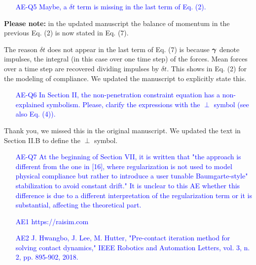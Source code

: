 \textcolor{blue}{\begin{itemize}
\item[AE-Q5] Maybe, a $\delta t$ term is missing in the last term of Eq. (2).
\end{itemize}} 

\textbf{Please note:} in the updated manuscript the balance of momentum in the
previous Eq. (2) is now stated in Eq. (7).

The reason $\delta t$ does not appear in the last term of Eq. (7) is because
${\bm\gamma}$ denote impulses, the integral (in this case over one time step) of the
forces. Mean forces over a time step are recovered dividing impulses by $\delta
t$. This shows in Eq. (2) for the modeling of compliance. We updated the
manuscript to explicitly state this.

\textcolor{blue}{\begin{itemize}
\item[AE-Q6] In Section II, the non-penetration constraint equation has a non-explained
symbolism. Please, clarify the expressions with the $\perp$ symbol (see also Eq.
(4)).\end{itemize}}

Thank you, we missed this in the original manuscript. We updated the text in
Section II.B to define the $\perp$ symbol.
    
\textcolor{blue}{\begin{itemize}
\item[AE-Q7] At the beginning of Section VII, it is written that "the approach is
different from the one in [16], where regularization is not used to model
physical compliance but rather to introduce a user tunable Baumgarte-style"
stabilization to avoid constant drift." It is unclear to this AE whether this
difference is due to a different interpretation of the regularization term or it
is substantial, affecting the theoretical part.\end{itemize}} 

\vspace{5mm}
\textcolor{blue}{\begin{itemize}
    \item[AE1] https://raisim.com
    \item[AE2] J. Hwangbo, J. Lee, M. Hutter, "Pre-contact iteration method for
solving contact dynamics," IEEE Robotics and Automation Letters, vol. 3, n. 2,
pp. 895-902, 2018.\end{itemize}} 

